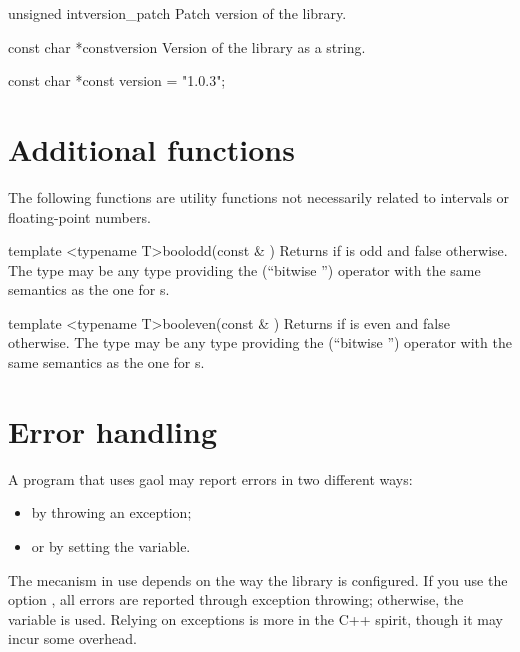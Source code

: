 \documentclass{manual}
\begin{document}
\begin{defconst}{unsigned int}{version\_patch}
  Patch version of the library.
\end{defconst}

\begin{defconst}{const char *const}{version}
  Version of the library as a string.
\begin{example}
 const char *const version = "1.0.3";
\end{example}
\end{defconst}

\chapter{Additional functions}

The following functions are utility functions not necessarily related to
intervals or floating-point numbers.

\begin{defTfun}{template <typename T>}{bool}{odd}{(const \& )}
  Returns  if  is odd and false otherwise. The 
  type may be any type providing the \code{\&} (``bitwise '') operator
  with the same semantics as the one for s.
\end{defTfun}

\begin{defTfun}{template <typename T>}{bool}{even}{(const \& )}
  Returns  if  is even and false otherwise. The 
  type may be any type providing the \code{\&} (``bitwise '') operator
  with the same semantics as the one for s.
\end{defTfun}

\chapter{Error handling}

A program that uses gaol may report errors in two different ways:
\begin{itemize}
\item by throwing an exception;
\item or by setting the  variable.
\end{itemize}

The mecanism in use depends on the way the library is configured. If
you use the option , all errors are
reported through exception throwing; otherwise, the 
variable is used. Relying on exceptions is more in the C++ spirit,
though it may incur some overhead.
\end{document}
